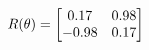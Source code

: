 \documentclass[preview]{standalone}
\begin{document}
\begin{align*}
\special{dvisvgm:raw <g id='unique000'>}R(\theta) = \begin{bmatrix}0.17 & 0.98\\-0.98 & 0.17\end{bmatrix}\special{dvisvgm:raw </g>}
\end{align*}
\end{document}
